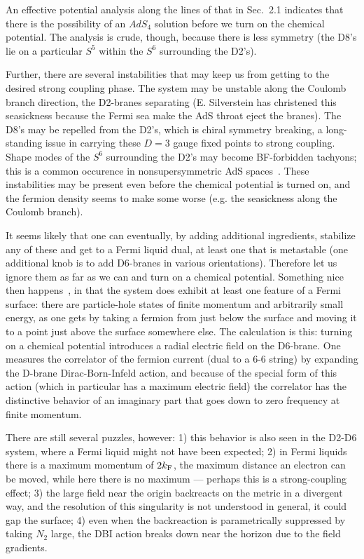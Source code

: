 \documentclass[12pt]{article}
\begin{document}
{An effective potential analysis along the lines of that in Sec.~2.1 indicates that there is the possibility of an $AdS_4$ solution before we turn on the chemical potential.  The analysis is crude, though, because there is less symmetry (the D8's lie on a particular $S^5$ within the $S^6$ surrounding the D2's).

Further, there are several instabilities that may keep us from getting to the desired strong coupling phase.  The system may be unstable along the Coulomb branch direction, the D2-branes separating (E. Silverstein has christened this seasickness because the Fermi sea make the AdS throat eject the branes).  The D8's may be repelled from the D2's, which is chiral symmetry breaking, a long-standing issue in carrying these $D=3$ gauge fixed points to strong coupling.  Shape modes of the $S^6$ surrounding the D2's may become BF-forbidden tachyons; this is a common occurence in nonsupersymmetric AdS spaces~\cite{DeWolfe:2001nz}.  These instabilities may be present even before the chemical potential is turned on, and the fermion density seems to make some worse (e.g. the seasickness along the Coulomb branch).

It seems likely that one can eventually, by adding additional ingredients, stabilize any of these and get to a Fermi liquid dual, at least one that is metastable (one additional knob is to add D6-branes in various orientations).  Therefore let us ignore them as far as we can and turn on a chemical potential.  Something nice then happens~\cite{Kulaxizi:2008jx}, in that the system does exhibit at least one feature of a Fermi surface: there are particle-hole states of finite momentum and arbitrarily small energy, as one gets by taking a fermion from just below the surface and moving it to a point just above the surface somewhere else.  The calculation is this: turning on a chemical potential introduces a radial electric field on the D6-brane.  One measures the correlator of the fermion current (dual to a 6-6 string) by expanding the D-brane Dirac-Born-Infeld action, and because of the special form of this action (which in particular has a maximum electric field) the correlator has the distinctive behavior of an imaginary part that goes down to zero frequency at finite momentum.

There are still several puzzles, however: 1) this behavior is also seen in the D2-D6 system, where a Fermi liquid might not have been expected; 2) in Fermi liquids there is a maximum momentum of $2k_{\rm F}$, the maximum distance an electron can be moved, while here there is no maximum --- perhaps this is a strong-coupling effect; 3) the large field near the origin backreacts on the metric in a divergent way, and the resolution of this singularity is not understood in general, it could gap the surface; 4) even when the backreaction is parametrically suppressed by taking $N_2$ large, the DBI action breaks down near the horizon due to the field gradients.

}
\end{document}
